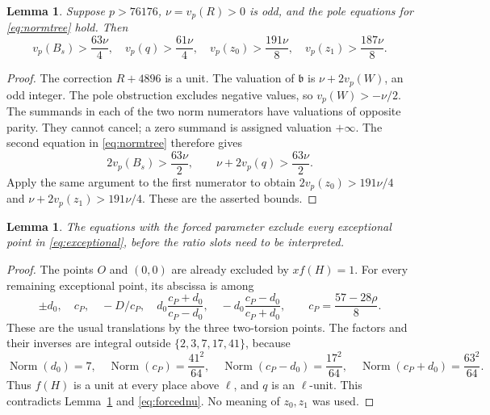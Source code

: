 \documentclass[11pt,a4paper]{article}
\newtheorem{lemma}[theorem]{Lemma}
\theoremstyle{definition}\newtheorem{definition}[theorem]{Definition}
\theoremstyle{remark}\newtheorem{remark}[theorem]{Remark}
\DeclareMathOperator{\Norm}{Norm}
\begin{document}
\begin{lemma}\label{lem:depth}
Suppose $p>76176$, $\nu=v_p(R)>0$ is odd, and the pole equations
for \eqref{eq:normtree} hold. Then
\[
 v_p(B_s)>\frac{63\nu}{4},\quad
 v_p(q)>\frac{61\nu}{4},\quad
 v_p(z_0)>\frac{191\nu}{8},\quad
 v_p(z_1)>\frac{187\nu}{8}.
\]
\end{lemma}
\begin{proof}
The correction $R+4896$ is a unit. The valuation of $\mathfrak b$ is
$\nu+2v_p(W)$, an odd integer. The pole obstruction excludes negative
values, so $v_p(W)>-\nu/2$. The summands in each of the two norm
numerators have valuations of opposite parity. They cannot cancel;
a zero summand is assigned valuation $+\infty$. The second equation
in \eqref{eq:normtree} therefore gives
\[
 2v_p(B_s)>\frac{63\nu}{2},\qquad
 \nu+2v_p(q)>\frac{63\nu}{2}.
\]
Apply the same argument to the first numerator to obtain
$2v_p(z_0)>191\nu/4$ and
$\nu+2v_p(z_1)>191\nu/4$. These are the asserted bounds.
\end{proof}

\begin{lemma}\label{lem:exclude}
The equations with the forced parameter exclude every exceptional
point in \eqref{eq:exceptional}, before the ratio slots need to be
interpreted.
\end{lemma}
\begin{proof}
The points $O$ and $(0,0)$ are already excluded by $xf(H)=1$.
For every remaining exceptional point, its abscissa is among
\[
 \pm d_0,\quad c_P,\quad -D/c_P,\quad
 d_0\frac{c_P+d_0}{c_P-d_0},\quad
 -d_0\frac{c_P-d_0}{c_P+d_0},
 \qquad c_P=\frac{57-28\rho}{8}.
\]
These are the usual translations by the three two-torsion points.
The factors and their inverses are integral outside
$\{2,3,7,17,41\}$, because
\[
 \Norm(d_0)=7,\quad \Norm(c_P)=\frac{41^2}{64},\quad
 \Norm(c_P-d_0)=\frac{17^2}{64},\quad
 \Norm(c_P+d_0)=\frac{63^2}{64}.
\]
Thus $f(H)$ is a unit at every place above $\ell$, and $q$ is an
$\ell$-unit. This contradicts Lemma~\ref{lem:depth} and
\eqref{eq:forcednu}. No meaning of $z_0,z_1$ was used.
\end{proof}
\end{document}
